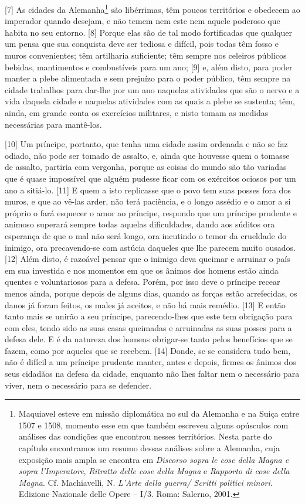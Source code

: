 {[}7{]} As cidades da Alemanha\footnote{Maquiavel esteve em missão
  diplomática no sul da Alemanha e na Suiça entre 1507 e 1508, momento
  esse em que também escreveu alguns opúsculos com análises das
  condições que encontrou nesses territórios. Nesta parte do capítulo
  encontramos um resumo dessas análises sobre a Alemanha, cuja exposição
  mais ampla se encontra em \emph{Discorso sopra le cose della Magna e
  sopra l'Imperatore}, \emph{Ritratto delle cose della Magna} e
  \emph{Rapporto di cose della Magna}. Cf. Machiavelli, N. \emph{L'Arte
  della guerra/ Scritti politici minori}. Edizione Nazionale delle Opere
  -- I/3. Roma: Salerno, 2001.} são libérrimas, têm poucos territórios e
obedecem ao imperador quando desejam, e não temem nem este nem aquele
poderoso que habita no seu entorno. {[}8{]} Porque elas são de tal modo
fortificadas que qualquer um pensa que sua conquista deve ser tediosa e
difícil, pois todas têm fosso e muros convenientes; têm artilharia
suficiente; têm sempre nos celeiros públicos bebidas, mantimentos e
combustíveis para um ano; {[}9{]} e, além disto, para poder manter a
plebe alimentada e sem prejuízo para o poder público, têm sempre na
cidade trabalhos para dar-lhe por um ano naquelas atividades que são o
nervo e a vida daquela cidade e naquelas atividades com as quais a plebe
se sustenta; têm, ainda, em grande conta os exercícios militares, e
nisto tomam as medidas necessárias para mantê-los.

{[}10{]} Um príncipe, portanto, que tenha uma cidade assim ordenada e
não se faz odiado, não pode ser tomado de assalto, e, ainda que houvesse
quem o tomasse de assalto, partiria com vergonha, porque as coisas do
mundo são tão variadas que é quase impossível que alguém pudesse ficar
com os exércitos ociosos por um ano a sitiá-lo. {[}11{]} E quem a isto
replicasse que o povo tem suas posses fora dos muros, e que ao vê-las
arder, não terá paciência, e o longo assédio e o amor a si próprio o
fará esquecer o amor ao príncipe, respondo que um príncipe prudente e
animoso superará sempre todas aquelas dificuldades, dando aos súditos
ora esperança de que o mal não será longo, ora incutindo o temor da
crueldade do inimigo, ora precavendo-se com astúcia daqueles que lhe
parecem muito ousados. {[}12{]} Além disto, é razoável pensar que o
inimigo deva queimar e arruinar o país em sua investida e nos momentos
em que os ânimos dos homens estão ainda quentes e voluntariosos para a
defesa. Porém, por isso deve o príncipe recear menos ainda, porque
depois de alguns dias, quando as forças estão arrefecidas, os danos já
foram feitos, os males já aceitos, e não há mais remédio. {[}13{]} E
então tanto mais se unirão a seu príncipe, parecendo-lhes que este tem
obrigação para com eles, tendo sido as suas casas queimadas e arruinadas
as suas posses para a defesa dele. E é da natureza dos homens obrigar-se
tanto pelos benefícios que se fazem, como por aqueles que se recebem.
{[}14{]} Donde, se se considera tudo bem, não é difícil a um príncipe
prudente manter, antes e depois, firmes os ânimos dos seus cidadãos na
defesa da cidade, enquanto não lhes faltar nem o necessário para viver,
nem o necessário para se defender.

